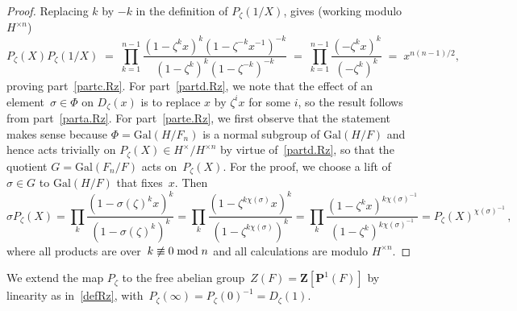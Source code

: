 \documentclass[12pt,reqno]{amsart}
\theoremstyle{definition}
\newtheorem{remark}[theorem]{Remark}
\newcommand{\changed}[1]{{#1}}
\def\={\;=\;}
\def\mod{\;\text{\rm mod}\;}
\def\Q{\mathbf Q}   %
\def\Z{\mathbf Z}   %
\def\s{\sigma} \def\a{\alpha}  \def\g{\gamma}   \def\z{\zeta}  \def\i{^{-1}}
\def\BP{\mathbf P}
\def\P{\BP}
\def\nn{n}
\def\Gal{\mathrm{Gal}}
\begin{document}
\begin{proof}
Replacing $k$ by $-k$ in the definition of $P_\z(1/X)$, gives \changed{ (working modulo~$H^{\times n}$)}
$$
\changed{P_{\z}(X)P_{\z}(1/X)\=\prod_{k = 1}^{n-1}
\frac{ 
(1-\z^kx)^k(1-\z^{-k}x^{-1})^{-k}}
{(1-\z^k)^k(1-\z^{-k})^{-k}}
\= \prod_{k= 1}^{n-1} \frac{(-\z^kx)^k}{ (-\z^k )^k  }  \= x^{n(n-1)/2},}$$
proving part~\ref{partc.Rz}.
For part~\ref{partd.Rz}, we note 
that the effect of an element~$\s\in\Phi$ on $D_\z(x)$ is to replace $x$ 
by $\z^i x$ for some $i$, so the result follows from part~\ref{parta.Rz}.
For part~\ref{parte.Rz}, we first observe that the statement makes sense because 
$\Phi = \Gal(H/F_\nn)$ is a normal subgroup of $\Gal(H/F)$ and hence acts 
trivially on $P_\z(X)\in H^{\times}/H^{\times\nn}$ by virtue of~\ref{partd.Rz}, so that 
the quotient $G = \Gal(F_\nn/F)$ acts on~$P_\z(X)$. For the
proof, we choose a lift of $\sigma \in G$ to $\Gal(H/F)$ that fixes~$x$. Then
\changed{
$$
\s P_\z(X) = \prod_k
\frac{(1-\s(\z)^kx)^k }{(1-\s(\z)^k )^k }
= 
\prod_k 
 \frac
 {(1-\z^{k\chi(\s)}x)^k}
 {(1-\z^{k\chi(\s)})^k}
= \prod_k 
 \frac
 {(1-\z^k x)^{k\chi(\s)\i}}
 {(1-\z^k)^{k\chi(\s)\i}}  
=P_\z(X)^{\chi(\s)\i}\,,
$$ 
where all products are over~$k \not\equiv 0 \mod \nn$ and all calculations are modulo 
$H^{\times\nn}$.}
\end{proof}


We extend the map $P_\z$ to the free abelian group~$Z(F)=\Z[\P^1(F)]$
by linearity as in~\eqref{defRz}, \changed{with~$P_{\z}(\infty) = P_{\z}(0)^{-1} = D_{\z}(1)$.}
\end{document}
